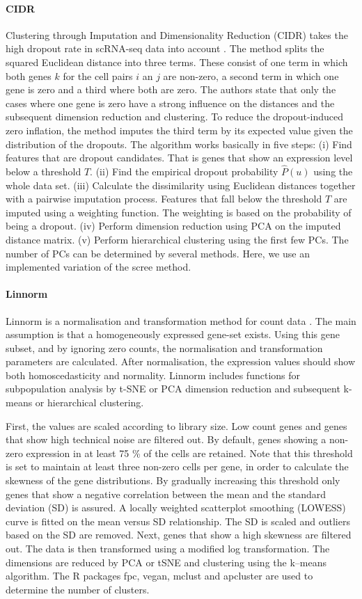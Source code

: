 \documentclass[11pt, a4paper]{article}\usepackage[]{graphicx}\usepackage[]{color}
\begin{document}
\paragraph{CIDR}
Clustering through Imputation and Dimensionality Reduction (CIDR) takes the high dropout rate in scRNA-seq data into account \citep{lin2017cidr}. The method splits the squared Euclidean distance into three terms. These consist of one term in which both genes $k$ for the cell pairs $i$ an $j$ are non-zero, a second term in which one gene is zero and a third where both are zero. The authors state that only the cases where one gene is zero have a strong influence on the distances and the subsequent dimension reduction and clustering. To reduce the dropout-induced zero inflation, the method imputes the third term by its expected value given the distribution of the dropouts. 
The algorithm works basically in five steps: (i) Find features that are dropout candidates. That is genes that show an expression level below a threshold $T$. (ii) Find the empirical dropout probability $\hat P(u)$ using the whole data set. (iii) Calculate the dissimilarity using Euclidean distances together with a pairwise imputation process. Features that fall below the threshold $T$ are imputed using a weighting function. The weighting is based on the probability of being a dropout. (iv) Perform dimension reduction using PCA on the imputed distance matrix. (v) Perform hierarchical clustering using the first few PCs. The number of PCs can be determined by several methods. Here, we use an implemented variation of the scree method. 
\paragraph{Linnorm }
Linnorm is a normalisation and transformation method for count data \citep{yip2017linnorm}. The main assumption is that a homogeneously expressed gene-set exists. Using this gene subset, and by ignoring zero counts, the normalisation and transformation parameters are calculated. After normalisation, the expression values should show both homoscedasticity and normality. Linnorm includes functions for subpopulation analysis by t-SNE or PCA dimension reduction and subsequent k-means or hierarchical clustering. 

First, the values are scaled according to library size. Low count genes and genes that show high technical noise are filtered out. By default, genes showing a non-zero expression in at least 75 \% of the cells are retained. Note that this threshold is set to maintain at least three non-zero cells per gene, in order to calculate the skewness of the gene distributions. By gradually increasing this threshold only genes that show a negative correlation between the mean and the standard deviation (SD) is assured. 
A locally weighted scatterplot smoothing (LOWESS) curve is fitted on the mean versus SD relationship. The SD is scaled and outliers based on the SD are removed. Next, genes that show a high skewness are filtered out. The data is then transformed using a modified log transformation.
The dimensions are reduced by PCA or tSNE and clustering using the k--means algorithm. The R packages fpc, vegan, mclust and apcluster are used to determine the number of clusters.
\end{document}
